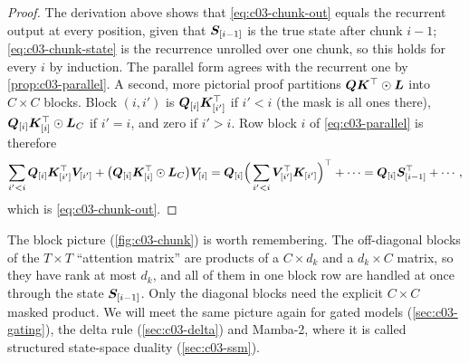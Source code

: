 \begin{proof}
The derivation above shows that \cref{eq:c03-chunk-out} equals the recurrent output at every
position, given that $\bm{S}_{[i-1]}$ is the true state after chunk $i-1$; \cref{eq:c03-chunk-state}
is the recurrence unrolled over one chunk, so this holds for every $i$ by induction. The
parallel form agrees with the recurrent one by \cref{prop:c03-parallel}. A second, more
pictorial proof partitions $\bm{Q}\bm{K}^{\top}\odot\bm{L}$ into $C\times C$ blocks. Block $(i,i')$ is
$\bm{Q}_{[i]}\bm{K}_{[i']}^{\top}$ if $i'<i$ (the mask is all ones there), $\bm{Q}_{[i]}\bm{K}_{[i]}^{\top}\odot\bm{L}_C$
if $i'=i$, and zero if $i'>i$. Row block $i$ of \cref{eq:c03-parallel} is therefore
\[
  \sum_{i'<i}\bm{Q}_{[i]}\bm{K}_{[i']}^{\top}\bm{V}_{[i']}+\big(\bm{Q}_{[i]}\bm{K}_{[i]}^{\top}\odot\bm{L}_C\big)\bm{V}_{[i]}
  =\bm{Q}_{[i]}\Big(\sum_{i'<i}\bm{V}_{[i']}^{\top}\bm{K}_{[i']}\Big)^{\top}+\cdots
  =\bm{Q}_{[i]}\bm{S}_{[i-1]}^{\top}+\cdots,
\]
which is \cref{eq:c03-chunk-out}.
\end{proof}

The block picture (\cref{fig:c03-chunk}) is worth remembering. The off-diagonal blocks of the
$T\times T$ ``attention matrix'' are products of a $C\times d_k$ and a $d_k\times C$ matrix, so
they have rank at most $d_k$, and all of them in one block row are handled at once through the
state $\bm{S}_{[i-1]}$. Only the diagonal blocks need the explicit $C\times C$ masked product. We
will meet the same picture again for gated models (\cref{sec:c03-gating}), the delta rule
(\cref{sec:c03-delta}) and Mamba-2, where it is called structured state-space duality
(\cref{sec:c03-ssm}).

